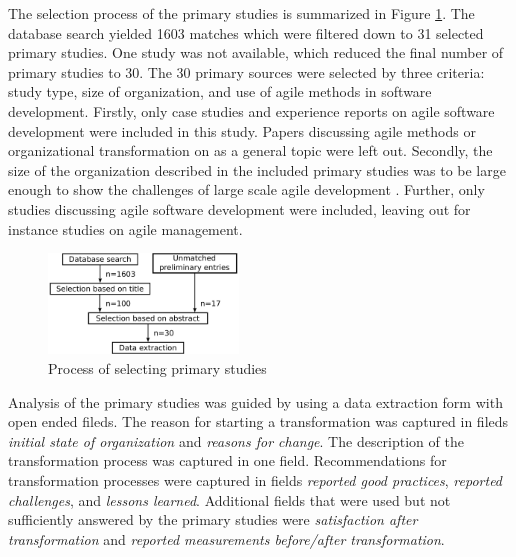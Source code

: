 \documentclass[lnbip]{svmultln}
\begin{document}

The selection process of the primary studies is summarized in Figure
\ref{fig:selection_process}. The database search yielded 1603 matches which were
filtered down to 31 selected primary studies. One study was not available, which
reduced the final number of primary studies to 30.
The 30 primary sources were selected by three criteria: study type, size of
organization, and use of agile methods in software development. Firstly, only
case studies and experience reports on agile software development were included
in this study. Papers discussing agile methods or organizational transformation
on as a general topic were left out. Secondly, the size of the organization
described in the included primary studies was to be large enough to show the
challenges of large scale agile development . Further,
only studies discussing agile software development were included, leaving out
for instance studies on agile management.

\begin{figure}[t]
  \begin{center}
    \includegraphics[width=0.45\textwidth]{researchprocess}
    \caption{Process of selecting primary studies}
    \label{fig:selection_process}
  \end{center}
\end{figure}


Analysis of the primary studies was guided by using a data extraction form with
open ended fileds. The reason for starting a transformation was captured in
fileds \textit{initial state of organization} and \textit{reasons for change}.
The description of the transformation process was captured in one field.
Recommendations for transformation processes were captured in fields
\textit{reported good practices}, \textit{reported challenges}, and
\textit{lessons learned}.
Additional fields that were used but not sufficiently answered by the primary
studies were \textit{satisfaction after transformation} and \textit{reported
measurements before/after transformation}.
\end{document}
